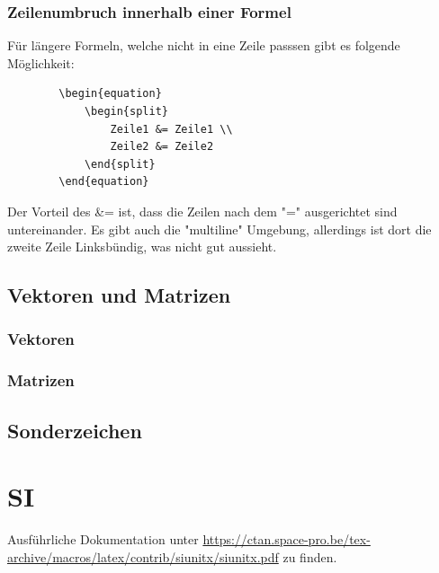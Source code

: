 	\subsubsection{Zeilenumbruch innerhalb einer Formel}
	Für längere Formeln, welche nicht in eine Zeile passsen gibt es folgende Möglichkeit:
	\begin{verbatim}
		\begin{equation} 
			\begin{split} 
				Zeile1 &= Zeile1 \\ 
				Zeile2 &= Zeile2
			\end{split} 
		\end{equation} 
	\end{verbatim}
	Der Vorteil des \&= ist, dass die Zeilen nach dem "=" ausgerichtet sind untereinander. Es gibt auch die "multiline" Umgebung, allerdings ist dort die zweite Zeile Linksbündig, was nicht gut aussieht.
	
	\subsection{Vektoren und Matrizen}
	\subsubsection{Vektoren}
	\subsubsection{Matrizen}
	
	\subsection{Sonderzeichen}
	
	
	
	\newpage
	\section{SI}
	Ausführliche Dokumentation unter \url{https://ctan.space-pro.be/tex-archive/macros/latex/contrib/siunitx/siunitx.pdf} zu finden.
	
	
	
	\newpage
